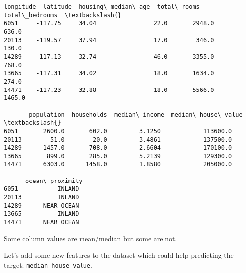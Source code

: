 \documentclass[11pt]{article}
\makeatletter
\newcommand{\boxspacing}{\kern\kvtcb@left@rule\kern\kvtcb@boxsep}
\newcommand{\prompt}[4]{
        {\ttfamily\llap{{\color{#2}[#3]:\hspace{3pt}#4}}\vspace{-\baselineskip}}
    }
\makeatother
\begin{document}
            \begin{tcolorbox}[breakable, size=fbox, boxrule=.5pt, pad at break*=1mm, opacityfill=0]
\prompt{Out}{outcolor}{63}{\boxspacing}
\begin{Verbatim}[commandchars=\\\{\}]
       longitude  latitude  housing\_median\_age  total\_rooms  total\_bedrooms  \textbackslash{}
6051     -117.75     34.04                22.0       2948.0           636.0
20113    -119.57     37.94                17.0        346.0           130.0
14289    -117.13     32.74                46.0       3355.0           768.0
13665    -117.31     34.02                18.0       1634.0           274.0
14471    -117.23     32.88                18.0       5566.0          1465.0

       population  households  median\_income  median\_house\_value  \textbackslash{}
6051       2600.0       602.0         3.1250            113600.0
20113        51.0        20.0         3.4861            137500.0
14289      1457.0       708.0         2.6604            170100.0
13665       899.0       285.0         5.2139            129300.0
14471      6303.0      1458.0         1.8580            205000.0

      ocean\_proximity
6051           INLAND
20113          INLAND
14289      NEAR OCEAN
13665          INLAND
14471      NEAR OCEAN
\end{Verbatim}
\end{tcolorbox}
        
    Some column values are mean/median but some are not.

    Let's add some new features to the dataset which could help predicting
the target: \texttt{median\_house\_value}.
\end{document}
